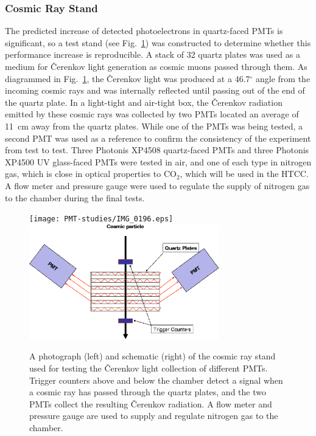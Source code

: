 \subsubsection{Cosmic Ray Stand}
\label{cosmicstand}

The predicted increase of detected photoelectrons in quartz-faced
PMTs is significant, so a test stand (see Fig.~\ref{test_stand})
was constructed to determine whether this performance increase is
reproducible.  A stack of 32 quartz plates was used as a medium for
{\v C}erenkov light generation as cosmic muons passed through them.
As diagrammed in Fig.~\ref{test_stand}, the {\v C}erenkov light was 
produced at a 46.7$^\circ$ angle from the incoming cosmic rays and was 
internally reflected until passing out of the end of the quartz plate. In 
a light-tight and air-tight box, the {\v C}erenkov radiation emitted by 
these cosmic rays was collected by two PMTs located an average of 11~cm 
away from the quartz plates.  While one of the PMTs was being tested, a 
second PMT was used as a reference to confirm the consistency of the 
experiment from test to test.  Three Photonis XP4508 quartz-faced PMTs and 
three Photonis XP4500 UV glass-faced PMTs were tested in air, and one of 
each type in nitrogen gas, which is close in optical properties to CO$_2$, 
which will be used in the HTCC.  A flow meter and pressure gauge were used 
to regulate the supply of nitrogen gas to the chamber during the final tests. 

\begin{figure}
\vspace{0.5cm}\begin{centering}
\texttt{[image: PMT-studies/IMG\_0196.eps]}
\includegraphics[height=5.0cm]{PMT-studies/cc_test.eps}
\vspace{0.5cm}
\caption{\small{A photograph (left) and schematic (right) of the cosmic 
ray stand used for testing the {\v C}erenkov light collection of different 
PMTs.  Trigger counters above and below the chamber detect a signal when 
a cosmic ray has passed through the quartz plates, and the two PMTs collect
the resulting {\v C}erenkov radiation. A flow meter and pressure gauge
are used to supply and regulate nitrogen gas to the chamber.}}
\label{test_stand}
\end{centering}
\end{figure}

